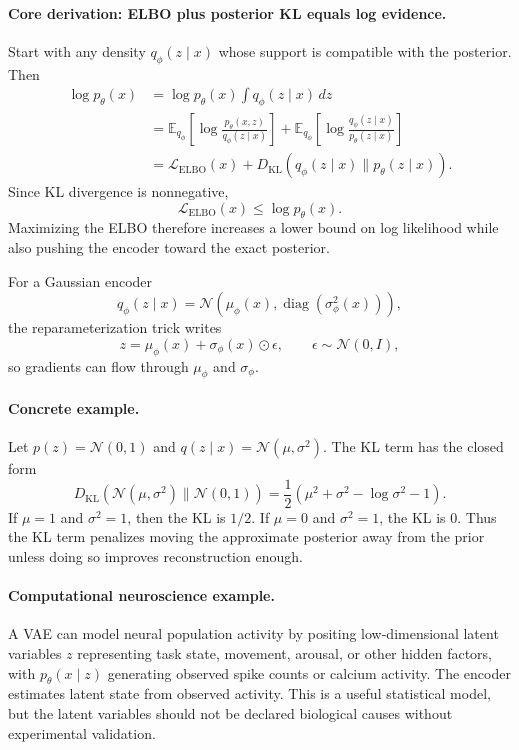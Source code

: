 \paragraph{Core derivation: ELBO plus posterior KL equals log evidence.}
Start with any density \(q_\phi(z\mid x)\) whose support is compatible with the posterior. Then
\[
\begin{aligned}
\log p_\theta(x)
&=\log p_\theta(x)\int q_\phi(z\mid x)\,dz\\
&=\mathbb{E}_{q_\phi}\left[\log\frac{p_\theta(x,z)}{q_\phi(z\mid x)}\right]
+\mathbb{E}_{q_\phi}\left[\log\frac{q_\phi(z\mid x)}{p_\theta(z\mid x)}\right]\\
&=\mathcal L_{\mathrm{ELBO}}(x)
+D_{\mathrm{KL}}(q_\phi(z\mid x)\|p_\theta(z\mid x)).
\end{aligned}
\]
Since KL divergence is nonnegative,
\[
\mathcal L_{\mathrm{ELBO}}(x)\leq \log p_\theta(x).
\]
Maximizing the ELBO therefore increases a lower bound on log likelihood while also pushing the encoder toward the exact posterior.

For a Gaussian encoder
\[
q_\phi(z\mid x)=\mathcal N(\mu_\phi(x),\operatorname{diag}(\sigma_\phi^2(x))),
\]
the reparameterization trick writes
\[
z=\mu_\phi(x)+\sigma_\phi(x)\odot\epsilon,\qquad
\epsilon\sim\mathcal N(0,I),
\]
so gradients can flow through \(\mu_\phi\) and \(\sigma_\phi\).

\paragraph{Concrete example.}
Let \(p(z)=\mathcal N(0,1)\) and \(q(z\mid x)=\mathcal N(\mu,\sigma^2)\). The KL term has the closed form
\[
D_{\mathrm{KL}}(\mathcal N(\mu,\sigma^2)\|\mathcal N(0,1))
=\frac12(\mu^2+\sigma^2-\log\sigma^2-1).
\]
If \(\mu=1\) and \(\sigma^2=1\), then the KL is \(1/2\). If \(\mu=0\) and \(\sigma^2=1\), the KL is \(0\). Thus the KL term penalizes moving the approximate posterior away from the prior unless doing so improves reconstruction enough.

\paragraph{Computational neuroscience example.}
A VAE can model neural population activity by positing low-dimensional latent variables \(z\) representing task state, movement, arousal, or other hidden factors, with \(p_\theta(x\mid z)\) generating observed spike counts or calcium activity. The encoder estimates latent state from observed activity. This is a useful statistical model, but the latent variables should not be declared biological causes without experimental validation.

